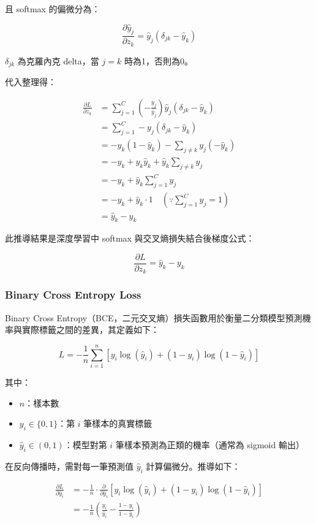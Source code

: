 \documentclass{article}
\begin{document}
且 softmax 的偏微分為：

\[
\frac{\partial \hat{y}_j}{\partial z_k} = \hat{y}_j (\delta_{jk} - \hat{y}_k)
\]

\(\delta_{jk}\) 為克羅內克 delta，當 \(j=k\) 時為1，否則為0。

代入整理得：

\[
\begin{aligned}
\frac{\partial L}{\partial z_k}
&= \sum_{j=1}^C \left(- \frac{y_j}{\hat{y}_j}\right) \hat{y}_j (\delta_{jk} - \hat{y}_k) \\
&= \sum_{j=1}^C - y_j (\delta_{jk} - \hat{y}_k) \\
&= - y_k (1 - \hat{y}_k) - \sum_{j \neq k} y_j (- \hat{y}_k) \\
&= - y_k + y_k \hat{y}_k + \hat{y}_k \sum_{j \neq k} y_j \\
&= - y_k + \hat{y}_k \sum_{j=1}^C y_j \\
&= - y_k + \hat{y}_k \cdot 1 \quad (\because \sum_{j=1}^C y_j = 1) \\
&= \hat{y}_k - y_k
\end{aligned}
\]


此推導結果是深度學習中 softmax 與交叉熵損失結合後梯度公式：

\[
\boxed{
\frac{\partial L}{\partial z_k} = \hat{y}_k - y_k
}
\]


\subsubsection{Binary Cross Entropy Loss}

Binary Cross Entropy（BCE，二元交叉熵）損失函數用於衡量二分類模型預測機率與實際標籤之間的差異，其定義如下：

\[
L = - \frac{1}{n} \sum_{i=1}^n \left[ y_i \log(\hat{y}_i) + (1 - y_i) \log(1 - \hat{y}_i) \right]
\]

其中：
\begin{itemize}
  \item \(n\)：樣本數
  \item \(y_i \in \{0,1\}\)：第 \(i\) 筆樣本的真實標籤
  \item \(\hat{y}_i \in (0,1)\)：模型對第 \(i\) 筆樣本預測為正類的機率（通常為 sigmoid 輸出）
\end{itemize}

在反向傳播時，需對每一筆預測值 \(\hat{y}_i\) 計算偏微分。推導如下：

\[
\begin{aligned}
\frac{\partial L}{\partial \hat{y}_i}
&= - \frac{1}{n} \cdot \frac{\partial}{\partial \hat{y}_i} \left[ y_i \log(\hat{y}_i) + (1 - y_i) \log(1 - \hat{y}_i) \right] \\
&= - \frac{1}{n} \left( \frac{y_i}{\hat{y}_i} - \frac{1 - y_i}{1 - \hat{y}_i} \right)
\end{aligned}
\]
\end{document}
